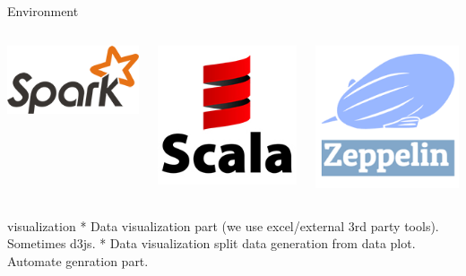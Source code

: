 \documentclass[unicode, notheorems]{beamer}
\begin{document}
\begin{frame}{Environment}
\begin{columns}
\begin{center}
	\includegraphics[scale=0.5]{images/spark-logo}
\end{center}
\begin{center}
	\includegraphics[scale=0.5]{images/scala}
\end{center}
\begin{center}
	\includegraphics[scale=0.5]{images/zeppelin}
\end{center}
\end{columns}

\end{frame}

\begin{frame}{visualization}
* Data visualization part (we use excel/external 3rd party tools). Sometimes d3js.
* Data visualization split data generation from data plot. Automate genration part.
\end{frame}
\end{document}
